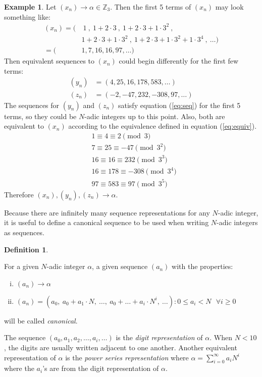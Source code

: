 \documentclass[english]{article}
\def\zzz{\mathbb{Z}}
\def\xn{(x_n)}
\def\yn{(y_n)}
\def\zn{(z_n)}
\def\an{(a_n)}
\theoremstyle{plain}
\theoremstyle{definition}
\newtheorem{definition}[theorem]{Definition}%
\newtheorem{example}[theorem]{Example}
\theoremstyle{remark}
\begin{document}
\begin{example} \label{ex:equiv-seq}
  Let $\xn \rightarrow \alpha \in \zzz_3$. Then the first 5 terms of
  $\xn$ may look something like:
  \begin{align*}
    \xn = (&\ 1\ , \ 1+2\cdot3 \ , \ 1+2\cdot3+1\cdot3^2 \ ,\\
            &1+2\cdot3+1\cdot3^2 \ , \ 1+2\cdot3+1\cdot3^2+1\cdot3^4 \ ,
              \ \dots)\\
        = (&1,7,16,16,97,\dots)
  \end{align*}
  Then equivalent sequences to $\xn$ could begin differently for the first
  few terms:
  \begin{align*}
    \yn &= (4,25,16,178,583,\dots) \\
    \zn &= (-2,-47,232,-308,97,\dots)
  \end{align*}
  The sequences for $\yn$ and $\zn$ satisfy equation (\ref{eq:seq}) for the
  first 5 terms, so they could be $N$-adic integers up to this point. Also,
  both are equivalent to $\xn$ according to the equivalence defined in
  equation (\ref{eq:equiv}).
  \begin{align*}
    &1 \equiv 4 \equiv 2 \pmod 3 \\
    &7 \equiv 25 \equiv -47 \pmod{3^2} \\
    &16 \equiv 16 \equiv 232 \pmod{3^3} \\
    &16 \equiv 178 \equiv -308 \pmod{3^4} \\
    &97 \equiv 583 \equiv 97 \pmod{3^5}
  \end{align*}
  Therefore $\xn,\yn,\zn \rightarrow \alpha$.
\end{example}

\par Because there are infinitely many sequence representations for any
$N$-adic integer, it is useful to define a canonical sequence to be used
when writing $N$-adic integers as sequences.
  
\begin{definition}
\label{def:canon}
  \par For a given $N$-adic integer $\alpha$, a given sequence $\an$ with
  the properties:
  \begin{enumerate}[i.]
    \item $\an \rightarrow \alpha$
    \item $\an=(a_0, \ a_0+a_1\cdot N, \ \dots, \ a_0+\dots+a_i\cdot N^i, \ \dots) : 0 \leq a_i < N \ \ \ \forall i \geq 0$
  \end{enumerate}
  will be called {\em canonical}.
  \par The sequence $(a_0,a_1,a_2,\dots,a_i,\dots)$ is the {\em digit
  representation} of $\alpha$. When $N<10$, the digits are usually
  written adjacent to one another. Another equivalent representation of $\alpha$
  is the {\it power series representation} where $\alpha=\sum_{i=0}^\infty
  a_iN^i$ where the $a_i$'s are from the digit representation of $\alpha$.
\end{definition}
\end{document}
